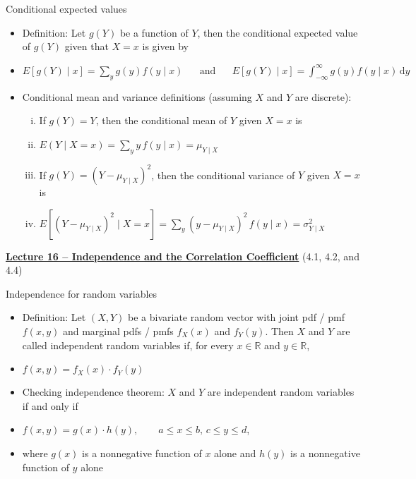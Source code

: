 \documentclass{article}
\newcommand{\bu}[1]{\textbf{\ul{#1}}}				%
\newcommand{\integral}[4]{\displaystyle \int_{#1}^{#2} #3 \,\mathrm{d} #4}		%
\begin{document}
Conditional expected values
\begin{itemize}
    \item Definition: Let $g(Y)$ be a function of $Y$, then the conditional expected value of $g(Y)$ given that $X = x$ is given by 
    \item[] $\displaystyle E[g(Y) \mid x ] = \sum_y g(y) f(y \mid x) \hspace{20pt} \text{and} \hspace{20pt} E[g(Y) \mid x] = \integral{-\infty}{\infty}{g(y) f(y \mid x)}{y}$
    \item Conditional mean and variance definitions (assuming $X$ and $Y$ are discrete):
    \begin{enumerate}[i)]
        \item If $g(Y) = Y$, then the conditional mean of $Y$ given $X = x$ is
        \item[] $\displaystyle E(Y \mid X = x) = \sum_y y \, f(y \mid x) = \mu_{Y \mid X}$
        \item If $g(Y) = (Y - \mu_{Y\mid X})^2$, then the conditional variance of $Y$ given $X = x$ is
        \item[] $\displaystyle E[(Y - \mu_{Y \mid X})^2 \mid X = x] = \sum_y (y - \mu_{Y \mid X})^2 \, f(y \mid x) = \sigma_{Y \mid X}^2$
    \end{enumerate}
\end{itemize}\bigskip

\vspace{100pt}

{\large \bu{Lecture 16 -- Independence and the Correlation Coefficient}} (4.1, 4.2, and 4.4)\bigskip

Independence for random variables\bigskip
\begin{itemize}
    \item Definition: Let $(X,Y)$ be a bivariate random vector with joint pdf / pmf $f(x,y)$ and marginal pdfs / pmfs $f_X(x)$ and $f_Y(y)$. Then $X$ and $Y$ are called independent random variables if, for every $x \in \mathbb{R}$ and $y \in \mathbb{R}$,
    \item[] $f(x,y) = f_X(x) \cdot f_Y(y)$
    \item Checking independence theorem: $X$ and $Y$ are independent random variables if and only if 
    \item[] $f(x,y) = g(x) \cdot h(y), \quad\quad a \le x \le b, \, c \le y \le d$,
    \item[] where $g(x)$ is a nonnegative function of $x$ alone and $h(y)$ is a nonnegative function of $y$ alone
\end{itemize}\bigskip
\end{document}
